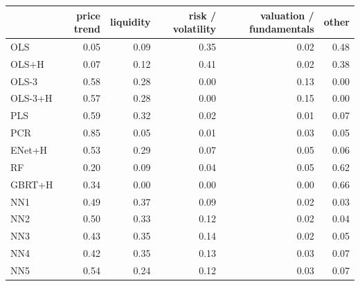 \begin{tabular}{lrrrrr}
\toprule
 & price trend & liquidity & risk / volatility & valuation / fundamentals & other \\
\midrule
OLS & 0.05 & 0.09 & 0.35 & 0.02 & 0.48 \\
OLS+H & 0.07 & 0.12 & 0.41 & 0.02 & 0.38 \\
OLS-3 & 0.58 & 0.28 & 0.00 & 0.13 & 0.00 \\
OLS-3+H & 0.57 & 0.28 & 0.00 & 0.15 & 0.00 \\
PLS & 0.59 & 0.32 & 0.02 & 0.01 & 0.07 \\
PCR & 0.85 & 0.05 & 0.01 & 0.03 & 0.05 \\
ENet+H & 0.53 & 0.29 & 0.07 & 0.05 & 0.06 \\
RF & 0.20 & 0.09 & 0.04 & 0.05 & 0.62 \\
GBRT+H & 0.34 & 0.00 & 0.00 & 0.00 & 0.66 \\
NN1 & 0.49 & 0.37 & 0.09 & 0.02 & 0.03 \\
NN2 & 0.50 & 0.33 & 0.12 & 0.02 & 0.04 \\
NN3 & 0.43 & 0.35 & 0.14 & 0.02 & 0.05 \\
NN4 & 0.42 & 0.35 & 0.13 & 0.03 & 0.07 \\
NN5 & 0.54 & 0.24 & 0.12 & 0.03 & 0.07 \\
\bottomrule
\end{tabular}

